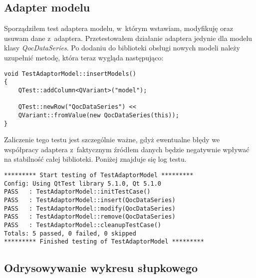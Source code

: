 \subsection{Adapter modelu}
Sporządziłem test adaptera modelu, w~którym wstawiam, modyfikuję oraz usuwam dane z~adaptera. Przetestowałem działanie adaptera jedynie dla modelu klasy \textit{QocDataSeries}. Po dodaniu do biblioteki obsługi nowych modeli należy uzupełnić metodę, która teraz wygląda następująco:

\begin{lstlisting}
void TestAdaptorModel::insertModels()
{
	QTest::addColumn<QVariant>("model");

	QTest::newRow("QocDataSeries") << 
	QVariant::fromValue(new QocDataSeries(this));
}
\end{lstlisting}

Zaliczenie tego testu jest szczególnie ważne, gdyż ewentualne błędy we współpracy adaptera z~faktycznym źródłem danych będzie negatywnie wpływać na stabilność całej biblioteki. Poniżej znajduje się log testu.

\begin{lstlisting}
********* Start testing of TestAdaptorModel *********
Config: Using QtTest library 5.1.0, Qt 5.1.0
PASS   : TestAdaptorModel::initTestCase()
PASS   : TestAdaptorModel::insert(QocDataSeries)
PASS   : TestAdaptorModel::modify(QocDataSeries)
PASS   : TestAdaptorModel::remove(QocDataSeries)
PASS   : TestAdaptorModel::cleanupTestCase()
Totals: 5 passed, 0 failed, 0 skipped
********* Finished testing of TestAdaptorModel *********
\end{lstlisting}

\subsection{Odrysowywanie wykresu słupkowego}



